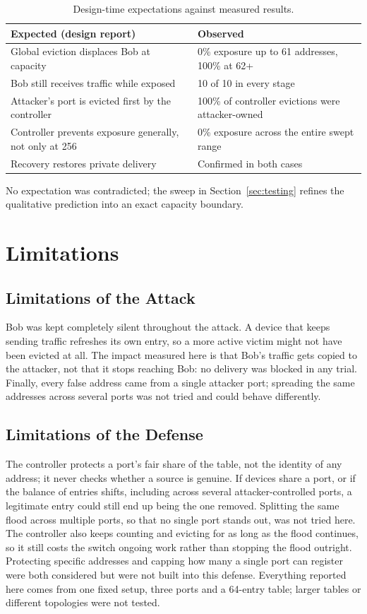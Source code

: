 \documentclass[10pt,a4paper]{article}
\begin{document}
\begin{table}[H]
\centering
\footnotesize
\begin{tabular}{@{}ll@{}}
\toprule
Expected (design report) & Observed\\\midrule
Global eviction displaces Bob at capacity & 0\% exposure up to 61 addresses, 100\% at 62+\\
Bob still receives traffic while exposed & 10 of 10 in every stage\\
Attacker's port is evicted first by the controller & 100\% of controller evictions were attacker-owned\\
Controller prevents exposure generally, not only at 256 & 0\% exposure across the entire swept range\\
Recovery restores private delivery & Confirmed in both cases\\\bottomrule
\end{tabular}
\caption{Design-time expectations against measured results.}\label{tab:expected}
\end{table}

No expectation was contradicted; the sweep in Section~\ref{sec:testing} refines the qualitative prediction into an exact capacity boundary.

\section{Limitations}\label{sec:limitations}
\subsection{Limitations of the Attack}
Bob was kept completely silent throughout the attack. A device that keeps sending traffic refreshes its own entry, so a more active victim might not have been evicted at all. The impact measured here is that Bob's traffic gets copied to the attacker, not that it stops reaching Bob: no delivery was blocked in any trial. Finally, every false address came from a single attacker port; spreading the same addresses across several ports was not tried and could behave differently.

\subsection{Limitations of the Defense}
The controller protects a port's fair share of the table, not the identity of any address; it never checks whether a source is genuine. If devices share a port, or if the balance of entries shifts, including across several attacker-controlled ports, a legitimate entry could still end up being the one removed. Splitting the same flood across multiple ports, so that no single port stands out, was not tried here. The controller also keeps counting and evicting for as long as the flood continues, so it still costs the switch ongoing work rather than stopping the flood outright. Protecting specific addresses and capping how many a single port can register were both considered but were not built into this defense. Everything reported here comes from one fixed setup, three ports and a 64-entry table; larger tables or different topologies were not tested.
\end{document}
